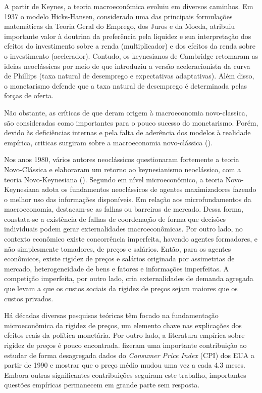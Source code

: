 \documentclass[twoside,a4paper,12pt]{report}
\begin{document}
A partir de Keynes, a teoria macroeconômica evoluiu em diversos caminhos. Em 1937 o modelo Hicks-Hansen, considerado uma das principais formulações matemáticas da Teoria Geral do Emprego, dos Juros e da Moeda, atribuiu importante valor à doutrina da preferência pela liquidez e sua interpretação dos efeitos do investimento sobre a renda (multiplicador) e dos efeitos da renda sobre o investimento (acelerador). Contudo, os keynesianos de Cambridge retomaram as ideias neoclássicas por meio de \citet{friedman1992money}que introduziu a versão aceleracionista da curva de Phillips (taxa natural de desemprego e expectativas adaptativas). Além disso, o monetarismo defende que a taxa natural de desemprego é determinada pelas forças de oferta. 

Não obstante, as críticas de \citet{lucas1972expectations} que deram origem à macroeconomia novo-classica, são consideradas como importantes para o pouco sucesso do monetarismo.  Porém, devido às deficiências internas e pela falta de aderência dos modelos à realidade empírica, criticas surgiram sobre a macroeconomia novo-clássica (\citet{mccallum1998stickiness}).

Nos anos 1980, vários autores neoclássicos  questionaram fortemente a teoria Novo-Clássica e elaboraram um retorno ao keynesianismo neoclássico, com a teoria Novo-Keynesiana (\citet{blinder1983money}). Segundo \citet{dathein2000crescimento} em nível microeconômico, a teoria Novo-Keynesiana adota os fundamentos neoclássicos de agentes maximizadores fazendo o melhor uso das informações disponíveis. Em relação aos microfundamentos da macroeconomia, destacam-se as falhas ou barreiras de mercado. Dessa forma, constata-se a existência de falhas de coordenação de forma que decisões individuais podem gerar externalidades macroeconômicas. Por outro lado, no contexto econômico existe concorrência imperfeita, havendo agentes formadores, e não simplesmente tomadores, de preços e salários. Então, para os agentes econômicos, existe rigidez de preços e salários originada por assimetrias de mercado, heterogeneidade de bens e fatores e informações imperfeitas. A competição imperfeita, por outro lado, cria externalidades de demanda agregada que levam a que os custos sociais da rigidez de preços sejam maiores que os custos privados. 

Há décadas diversas pesquisas teóricas têm focado na fundamentação microeconômica da rigidez de preços, um elemento chave nas explicações dos efeitos reais da política monetária. Por outro lado, a literatura empírica sobre rigidez de preços é pouco encontrada. \citet{bils2004some} fizeram uma importante contribuição ao estudar de forma desagregada dados do \emph{Consumer Price Index} (CPI) dos EUA a partir de 1990 e mostrar que o preço médio mudou uma vez a cada 4.3 meses. Embora outras significantes contribuições seguiram este trabalho, importantes questões empíricas permanecem em grande parte sem resposta.
\end{document}
